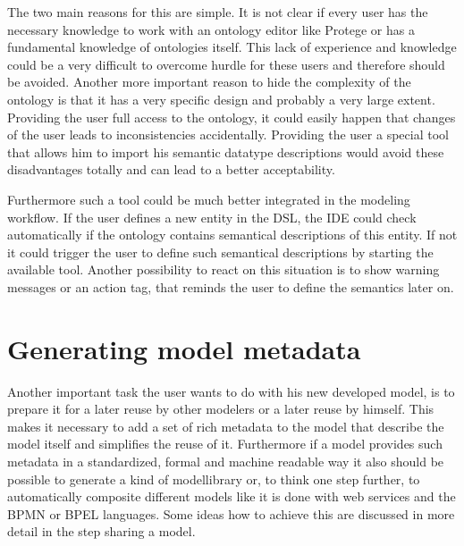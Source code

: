 The two main reasons for this are simple. It is not clear if every user has the necessary knowledge to work with an ontology editor like Protege or has a fundamental knowledge of ontologies itself. This lack of experience and knowledge could be a very difficult to overcome hurdle for these users and therefore should be avoided. Another more important reason to hide the complexity of the ontology is that it has a very specific design and probably a very large extent. Providing the user full access to the ontology, it could easily happen that changes of  the user leads to inconsistencies accidentally. Providing the user a special tool that allows him to import his semantic datatype descriptions would avoid these disadvantages totally and can lead to a better acceptability. 


Furthermore such a tool could be much better integrated in the modeling workflow. If the user defines a new entity in the DSL, the IDE could check automatically if the ontology contains semantical descriptions of this entity. If not it could trigger the user to define such semantical descriptions by starting the available tool. Another possibility to react on this situation is to show warning messages or an action tag, that reminds the user to define the semantics later on.

\section{Generating model metadata}

Another important task the user wants to do with his new developed model, is to prepare it for a later reuse by other modelers or a later reuse by himself. This makes it necessary to add a set of rich metadata to the model that describe the model itself and simplifies the reuse of it. Furthermore if a model provides such metadata in a standardized, formal and machine readable way it also should be possible to generate a kind of modellibrary or, to think one step further, to automatically composite different models like it is done with web services and the BPMN or BPEL languages. Some ideas how to achieve this are discussed in more detail in the step sharing a model.


